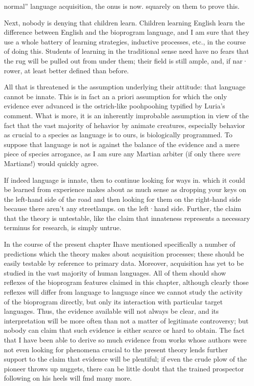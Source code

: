 {\textquotedbl}normal'' language acquisition, the onus is now. squarely on them to prove this.

Next, nobody is denying that children learn. Children learning English learn the difference between English and the bioprogram language, and I am sure that they use a whole battery of learning strategies, inductive processes, etc., in the course of doing this. Students of learning in the traditional sense need have no fears that the rug will be pulled out from under them; their field is still ample, and, if nar· rower, at least better defined than before.

All that is threatened is the assumption underlying their attitude: that language cannot be innate. This is in fact an a priori assumption for which the only evidence ever advanced is the ostrich-like pooh\-poohing typified by Luria's comment. What is more, it is an inherently improbable assumption in view of the fact that the vast majority of hehavior by animate creatures, especially behavior as crucial to a species as language is to ours, is biologically programmed. To suppose that language is not is against the balance of the evidence and a mere
piece of species arrogance, as I am sure any Martian arbiter (if only there \textit{were }Martians!) would quickly agree.

If indeed language is innate, then to continue looking for ways in. which it could be learned from experience makes about as much sense as dropping your keys on the left-hand side of the road and then looking for them on the right-hand side because there aren't any streetlamps. on the left·hand side. Further, the claim that the theory is untestable, like the claim that innateness represents a necessary terminus for research, is simply untrue.



In the course of the present chapter Ihave mentioned specifically a number of predictions which the theory makes about acquisition processes; these should be easily testable by reference to primary data. Moreover, acquisition has yet to be studied in the vast majority of human languages. All of them should show reflexes of the bioprogram features claimed in this chapter, although clearly those reflexes will differ from language to language since we cannot study the activity of the bioprogram directly, but only its interaction with particular target languages. Thus, the evidence available will not always be clear, and its interpretation will be more often than not a matter of legiti\-mate controversy; but nobody can claim that such evidence is either scarce or hard to obtain. The fact that I have been able to derive so much evidence from works whose authors were not even looking for phenomena crucial to the present theory lends further support to the claim that evidence will be plentiful; if even the crude plow of the pioneer throws up nuggets, there can be little doubt that the trained prospector following on his heels will fmd many more.

